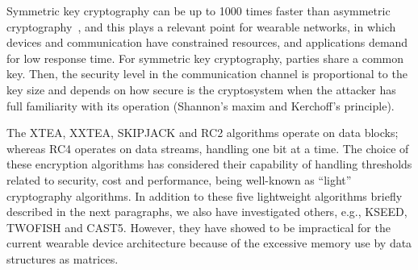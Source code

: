 
Symmetric key cryptography %
can be up to 1000 times faster than asymmetric cryptography~\cite{mandal2012evaluation}, and this plays a relevant point for wearable networks, in which devices and communication have constrained resources, and applications demand for low response time. For symmetric key cryptography, parties share a common key. %
Then, the security level in the communication channel is proportional to the key size and depends on how secure is the cryptosystem when the attacker has full familiarity with its operation (Shannon's maxim and Kerchoff’s principle). %

The XTEA, XXTEA, SKIPJACK and RC2 algorithms operate on data blocks; whereas RC4 operates on data streams, handling one bit at a time. %
The choice of these encryption algorithms has considered their capability of %
handling thresholds related to security, cost and performance, being well-known as ``light'' cryptography algorithms. In addition to these five lightweight algorithms briefly described in the next paragraphs, we also have investigated others, e.g., KSEED, TWOFISH and CAST5. However, they have showed to be impractical for the current wearable device architecture because of the excessive memory use by data structures as matrices.

